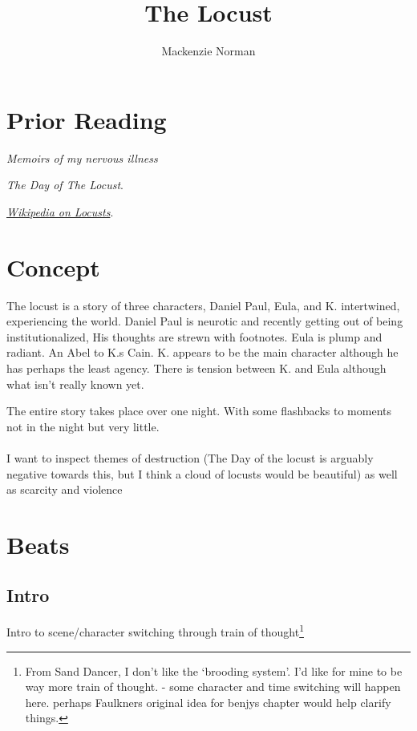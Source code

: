\documentclass{article}
\title{The Locust}
\author{Mackenzie Norman}
\begin{document}
\maketitle
\textit{}
\section*{Prior Reading}
\begin{list} {}
\item \textit{Memoirs of my nervous illness}
\item\textit{The Day of The Locust}. 
\item\textit{\href{https://en.wikipedia.org/wiki/Locust}{Wikipedia on Locusts}}. 

\end{list}
\section*{Concept}
The locust is a story of three characters, Daniel Paul, Eula, and K. intertwined, experiencing the world. 
Daniel Paul is neurotic and recently getting out of being institutionalized, His thoughts are strewn with footnotes. Eula is plump and radiant. An Abel to K.s Cain. K. appears to be the main character although he has perhaps the least agency. There is tension between K. and Eula although what isn't really known yet.

The entire story takes place over one night. With some flashbacks to moments not in the night but very little.
\paragraph{}
I want to inspect themes of destruction (The Day of the locust is arguably negative towards this,  but I think a cloud of locusts would be beautiful) as well as scarcity and violence 
\pagebreak
\section*{Beats}
\subsection*{Intro}  
Intro to scene/character switching through train of thought\footnote{From Sand Dancer, I don't like the `brooding system'. I'd like for mine to be way more train of thought. - some character and time switching will happen here. perhaps Faulkners original idea for benjys chapter would help clarify things.}
\end{document}
